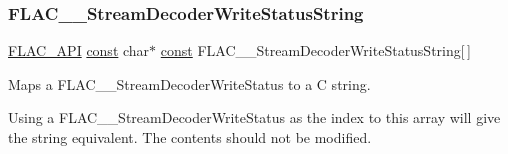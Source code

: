\subsubsection{\texorpdfstring{F\+L\+A\+C\+\_\+\+\_\+\+Stream\+Decoder\+Write\+Status\+String}{FLAC\_\_StreamDecoderWriteStatusString}}
{\footnotesize\ttfamily \hyperlink{group__flac__export_ga56ca07df8a23310707732b1c0007d6f5}{F\+L\+A\+C\+\_\+\+A\+PI} \hyperlink{zconf_8h_a2c212835823e3c54a8ab6d95c652660e}{const} char$\ast$ \hyperlink{zconf_8h_a2c212835823e3c54a8ab6d95c652660e}{const} F\+L\+A\+C\+\_\+\+\_\+\+Stream\+Decoder\+Write\+Status\+String\mbox{[}$\,$\mbox{]}}

Maps a F\+L\+A\+C\+\_\+\+\_\+\+Stream\+Decoder\+Write\+Status to a C string.

Using a F\+L\+A\+C\+\_\+\+\_\+\+Stream\+Decoder\+Write\+Status as the index to this array will give the string equivalent. The contents should not be modified. 